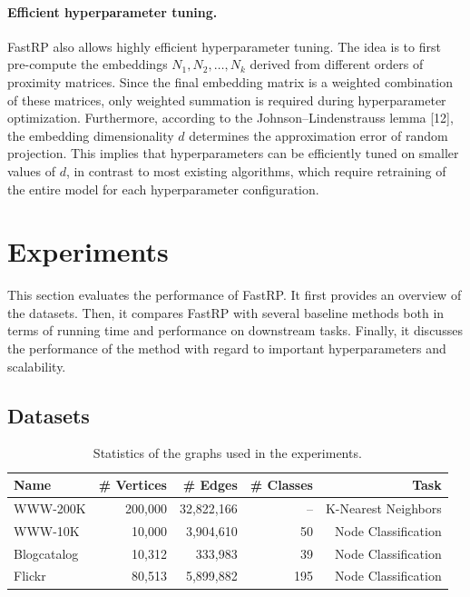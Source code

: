 \documentclass[11pt]{article}
\begin{document}
\paragraph{Efficient hyperparameter tuning.}
FastRP also allows highly efficient hyperparameter tuning. The idea is to first pre-compute the embeddings $N_1,N_2,\ldots,N_k$ derived from different orders of proximity matrices. Since the final embedding matrix is a weighted combination of these matrices, only weighted summation is required during hyperparameter optimization. Furthermore, according to the Johnson--Lindenstrauss lemma [12], the embedding dimensionality $d$ determines the approximation error of random projection. This implies that hyperparameters can be efficiently tuned on smaller values of $d$, in contrast to most existing algorithms, which require retraining of the entire model for each hyperparameter configuration.

\section{Experiments}

This section evaluates the performance of FastRP. It first provides an overview of the datasets. Then, it compares FastRP with several baseline methods both in terms of running time and performance on downstream tasks. Finally, it discusses the performance of the method with regard to important hyperparameters and scalability.

\subsection{Datasets}

\begin{table}[H]
\centering
\caption{Statistics of the graphs used in the experiments.}
\label{tab:datasets}
\begin{tabular}{@{}lrrrr@{}}
\toprule
Name & \# Vertices & \# Edges & \# Classes & Task \\
\midrule
WWW-200K & 200,000 & 32,822,166 & -- & K-Nearest Neighbors \\
WWW-10K & 10,000 & 3,904,610 & 50 & Node Classification \\
Blogcatalog & 10,312 & 333,983 & 39 & Node Classification \\
Flickr & 80,513 & 5,899,882 & 195 & Node Classification \\
\bottomrule
\end{tabular}
\end{table}
\end{document}
